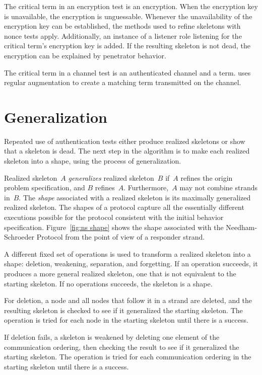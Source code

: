 \documentclass[12pt]{article}
\begin{document}
The critical term in an encryption test is an encryption.  When the
encryption key is unavailable, the encryption is unguessable.
Whenever the unavailability of the encryption key can be established,
the methods used to refine skeletons with nonce tests apply.
Additionally, an instance of a listener role listening for the
critical term's encryption key is added.  If the resulting skeleton
is not dead, the encryption can be explained by penetrator behavior.

The critical term in a channel test is an authenticated channel and a
term.  {\cpsa} uses regular augmentation to create a matching
term transmitted on the channel.

\section{Generalization}

Repeated use of authentication tests either produce realized skeletons
or show that a skeleton is dead.  The next step in the algorithm is to
make each realized skeleton into a shape, using the process of
generalization.

Realized skeleton~$A$ \emph{generalizes}
realized skeleton~$B$ if~$A$ refines the origin problem specification,
and $B$ refines~$A$.  Furthermore,~$A$ may not combine strands in~$B$.
The \emph{shape} associated with a realized skeleton is
its maximally generalized realized skeleton.  The shapes of a protocol
capture all the essentially different executions possible for the
protocol consistent with the initial behavior specification.
Figure~\ref{fig:ns shape} shows the shape associated with the
Needham-Schroeder Protocol from the point of view of a responder
strand.

A different fixed set of operations is used to transform a realized
skeleton into a shape: deletion, weakening, separation, and
forgetting.  If an operation succeeds, it produces a more general
realized skeleton, one that is not equivalent to the starting
skeleton.  If no operations succeeds, the skeleton is a shape.

For deletion, a node and all nodes that follow it in a strand are
deleted, and the resulting skeleton is checked to see if it
generalized the starting skeleton.  The operation is tried for each
node in the starting skeleton until there is a success.

If deletion fails, a skeleton is weakened by deleting one element of
the communication ordering, then checking the result to see if it
generalized the starting skeleton.  The operation is tried for each
communication ordering in the starting skeleton until there is a success.
\end{document}
